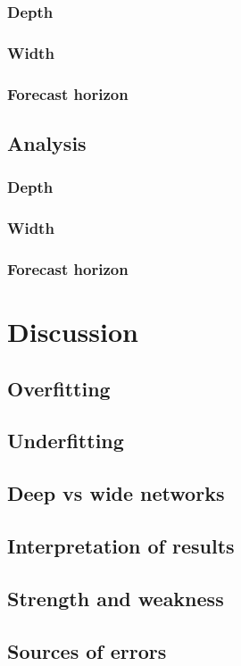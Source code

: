 \documentclass[a4paper,12pt]{article}
\begin{document}
\subsubsection{Depth}
\subsubsection{Width}
\subsubsection{Forecast horizon}
\subsection{Analysis}
\subsubsection{Depth}
\subsubsection{Width}
\subsubsection{Forecast horizon}
\section{Discussion}
\subsection{Overfitting}
\subsection{Underfitting}
\subsection{Deep vs wide networks}
\subsection{Interpretation of results}
\subsection{Strength and weakness}
\subsection{Sources of errors}
\end{document}
